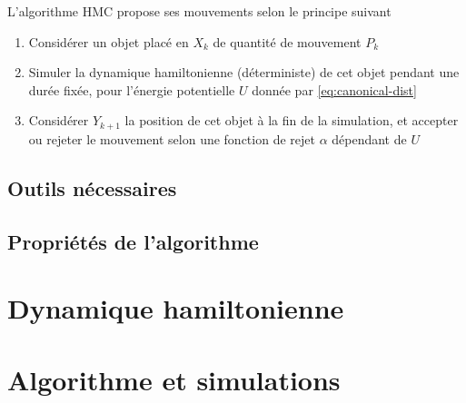 \documentclass[10pt,a4paper]{article}
\begin{document}
L'algorithme HMC propose ses mouvements selon le principe suivant
\begin{enumerate}
  \item Considérer un objet placé en $X_k$ de quantité de mouvement $P_k$
  \item Simuler la dynamique hamiltonienne (déterministe) de cet objet pendant une durée fixée, pour l'énergie potentielle $U$ donnée par \eqref{eq:canonical-dist}
  \item Considérer $Y_{k+1}$ la position de cet objet à la fin de la simulation, et accepter ou rejeter le mouvement selon une fonction de rejet $\alpha$ dépendant de $U$
\end{enumerate}

\subsection{Outils nécessaires}


\subsection{Propriétés de l'algorithme}


\section{Dynamique hamiltonienne}


\section{Algorithme et simulations}


\pagebreak


\end{document}
